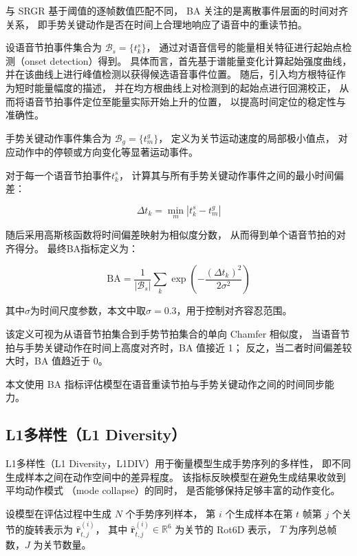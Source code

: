 与 SRGR 基于阈值的逐帧数值匹配不同，
BA 关注的是离散事件层面的时间对齐关系，
即手势关键动作是否在时间上合理地响应了语音中的重读节拍。

设语音节拍事件集合为
$\mathcal{B}_s = \{ t^s_k \}$，
通过对语音信号的能量相关特征进行起始点检测（onset detection）得到。
具体而言，首先基于谱能量变化计算起始强度曲线，
并在该曲线上进行峰值检测以获得候选语音事件位置。
随后，引入均方根特征作为短时能量幅度的描述，
并在均方根曲线上对检测到的起始点进行回溯校正，
从而将语音节拍事件定位至能量实际开始上升的位置，
以提高时间定位的稳定性与准确性。

手势关键动作事件集合为
$\mathcal{B}_g = \{ t^g_m \}$，
定义为关节运动速度的局部极小值点，
对应动作中的停顿或方向变化等显著运动事件。

对于每一个语音节拍事件$t^s_k$，
计算其与所有手势关键动作事件之间的最小时间偏差：

\begin{equation}
\Delta t_k = \min_{m} | t^s_k - t^g_m |
\end{equation}

随后采用高斯核函数将时间偏差映射为相似度分数，
从而得到单个语音节拍的对齐得分。
最终BA指标定义为：

\begin{equation}
\mathrm{BA} =
\frac{1}{|\mathcal{B}_s|}
\sum_{k}
\exp\left(
-\frac{(\Delta t_k)^2}{2\sigma^2}
\right)
\end{equation}

其中$\sigma$为时间尺度参数，本文中取$\sigma=0.3$，用于控制对齐容忍范围。

该定义可视为从语音节拍集合到手势节拍集合的单向 Chamfer 相似度，
当语音节拍与手势关键动作在时间上高度对齐时，BA 值接近 1；
反之，当二者时间偏差较大时，BA 值趋近于 0。

本文使用 BA 指标评估模型在语音重读节拍与手势关键动作之间的时间同步能力。

\subsection{L1多样性（L1 Diversity）}
\label{subsec:l1div}

L1多样性（L1 Diversity，L1DIV）\cite{beatcamn}用于衡量模型生成手势序列的多样性，
即不同生成样本之间在动作空间中的差异程度。
该指标反映模型在避免生成结果收敛到平均动作模式
（mode collapse）的同时，
是否能够保持足够丰富的动作变化。

设模型在评估过程中生成 $N$ 个手势序列样本，
第 $i$ 个生成样本在第 $t$ 帧第 $j$ 个关节的旋转表示为
$\hat{\mathbf{r}}^{(i)}_{t,j}$，
其中 $\hat{\mathbf{r}}^{(i)}_{t,j} \in \mathbb{R}^{6}$ 为关节的 Rot6D 表示，
$T$ 为序列总帧数，$J$ 为关节数量。

